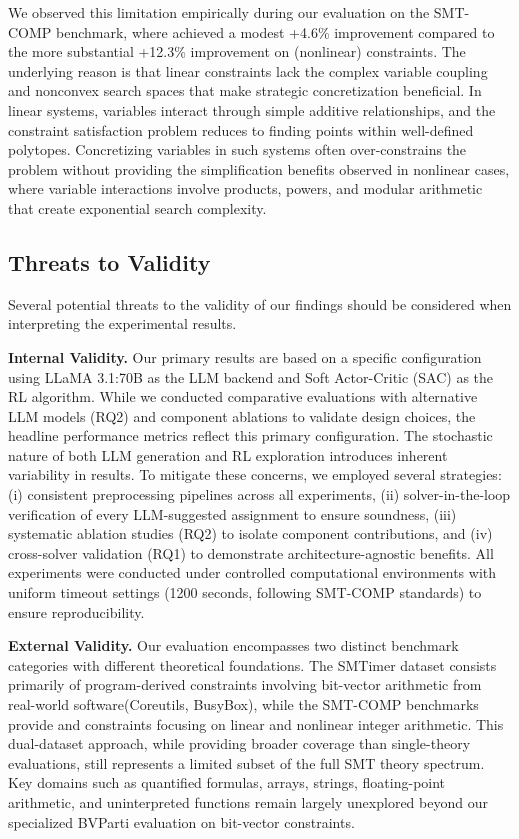 We observed this limitation empirically during our evaluation on the SMT-COMP \QFLIA{} benchmark, where \tool achieved a modest +4.6\% improvement compared to the more substantial +12.3\% improvement on \QFNIA{} (nonlinear) constraints. The underlying reason is that linear constraints lack the complex variable coupling and nonconvex search spaces that make strategic concretization beneficial. In linear systems, variables interact through simple additive relationships, and the constraint satisfaction problem reduces to finding points within well-defined polytopes. Concretizing variables in such systems often over-constrains the problem without providing the simplification benefits observed in nonlinear cases, where variable interactions involve products, powers, and modular arithmetic that create exponential search complexity.


\subsection{Threats to Validity}
Several potential threats to the validity of our findings should be considered when interpreting the experimental results.

\textbf{Internal Validity.} Our primary results are based on a specific configuration using LLaMA 3.1:70B as the LLM backend and Soft Actor-Critic (SAC) as the RL algorithm. While we conducted comparative evaluations with alternative LLM models (RQ2) and component ablations to validate design choices, the headline performance metrics reflect this primary configuration. The stochastic nature of both LLM generation and RL exploration introduces inherent variability in results. To mitigate these concerns, we employed several strategies: (i) consistent preprocessing pipelines across all experiments, (ii) solver-in-the-loop verification of every LLM-suggested assignment to ensure soundness, (iii) systematic ablation studies (RQ2) to isolate component contributions, and (iv) cross-solver validation (RQ1) to demonstrate architecture-agnostic benefits. All experiments were conducted under controlled computational environments with uniform timeout settings (1200 seconds, following SMT-COMP standards) to ensure reproducibility.

\textbf{External Validity.} Our evaluation encompasses two distinct benchmark categories with different theoretical foundations. The SMTimer dataset consists primarily of program-derived constraints involving bit-vector arithmetic from real-world software(Coreutils, BusyBox), while the SMT-COMP benchmarks provide \QFLIA{} and \QFNIA{} constraints focusing on linear and nonlinear integer arithmetic. This dual-dataset approach, while providing broader coverage than single-theory evaluations, still represents a limited subset of the full SMT theory spectrum. Key domains such as quantified formulas, arrays, strings, floating-point arithmetic, and uninterpreted functions remain largely unexplored beyond our specialized BVParti evaluation on bit-vector constraints.

